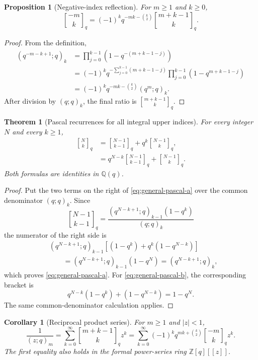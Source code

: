 \documentclass[11pt,oneside,openany]{book}
\newtheorem{theorem}{Theorem}[chapter]
\newtheorem{proposition}[proposition]{Proposition}
\newtheorem{corollary}[corollary]{Corollary}
\theoremstyle{definition}
\theoremstyle{remark}
\newcommand{\Qbinom}[3]{\genfrac{[}{]}{0pt}{}{#1}{#2}_{#3}}
\newcommand{\Q}{\mathbb Q}
\newcommand{\Z}{\mathbb Z}
\newcommand{\abs}[1]{\lvert #1\rvert}
\begin{document}
\begin{proposition}[Negative-index reflection]\label{prop:negative-gaussian}
For $m\ge1$ and $k\ge0$,
\[
 \Qbinom{-m}{k}q
 =(-1)^kq^{-mk-\binom k2}
   \Qbinom{m+k-1}{k}q.
 \tag{17.2}\label{eq:negative-reflection}
\]
\end{proposition}

\begin{proof}
From the definition,
\begin{align*}
 (q^{-m-k+1};q)_k
 &=\prod_{j=0}^{k-1}\left(1-q^{-(m+k-1-j)}\right)\\
 &=(-1)^kq^{-\sum_{j=0}^{k-1}(m+k-1-j)}
   \prod_{j=0}^{k-1}(1-q^{m+k-1-j})\\
 &=(-1)^kq^{-mk-\binom k2}(q^m;q)_k.
\end{align*}
After division by $(q;q)_k$, the final ratio is $\Qbinom{m+k-1}{k}q$.
\end{proof}

\begin{theorem}[Pascal recurrences for all integral upper indices]\label{thm:generalized-pascal}
For every integer $N$ and every $k\ge1$,
\begin{align}
 \Qbinom Nkq
 &=\Qbinom{N-1}{k-1}q+q^k\Qbinom{N-1}{k}q,
 \tag{17.3}\label{eq:general-pascal-a}\\
 &=q^{N-k}\Qbinom{N-1}{k-1}q+\Qbinom{N-1}{k}q.
 \tag{17.4}\label{eq:general-pascal-b}
\end{align}
Both formulas are identities in $\Q(q)$.
\end{theorem}

\begin{proof}
Put the two terms on the right of \eqref{eq:general-pascal-a} over the common denominator $(q;q)_k$.  Since
\[
 \Qbinom{N-1}{k-1}q
 =\frac{(q^{N-k+1};q)_{k-1}(1-q^k)}{(q;q)_k}
\]
the numerator of the right side is
\begin{align*}
 &(q^{N-k+1};q)_{k-1}
 \left[(1-q^k)+q^k(1-q^{N-k})\right]\\
 &\qquad=(q^{N-k+1};q)_{k-1}(1-q^N)
 =(q^{N-k+1};q)_k,
\end{align*}
which proves \eqref{eq:general-pascal-a}.  For \eqref{eq:general-pascal-b}, the corresponding bracket is
\[
 q^{N-k}(1-q^k)+(1-q^{N-k})=1-q^N.
\]
The same common-denominator calculation applies.
\end{proof}

\begin{corollary}[Reciprocal product series]\label{cor:reciprocal-product-negative}
For $m\ge1$ and $\abs z<1$,
\[
 \frac1{(z;q)_m}
 =\sum_{k=0}^{\infty}\Qbinom{m+k-1}{k}q z^k
 =\sum_{k=0}^{\infty}(-1)^kq^{mk+\binom k2}
   \Qbinom{-m}{k}qz^k.
 \tag{17.5}\label{eq:negative-reciprocal-series}
\]
The first equality also holds in the formal power-series ring $\Z[q][[z]]$.
\end{corollary}
\end{document}
